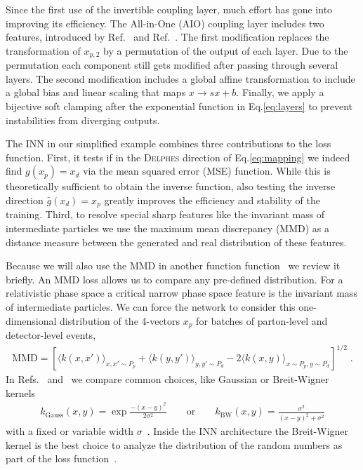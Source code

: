 Since the first use of the invertible coupling layer, much effort has
gone into improving its efficiency. The All-in-One (AIO) coupling
layer includes two features, introduced by Ref.~\cite{coupling2} and
Ref.~\cite{glow}. The first modification replaces the transformation
of $x_{p,2}$ by a permutation of the output of each layer. Due to the
permutation each component still gets modified after passing through
several layers. The second modification includes a global affine transformation
to include a global bias and linear scaling that maps $x \rightarrow s
x + b$. Finally, we apply a bijective soft clamping after the
exponential function in Eq.\eqref{eq:layers} to prevent instabilities
from diverging outputs.

The INN in our simplified example combines three contributions to the
loss function. First, it tests if in the \textsc{Delphes} direction of
Eq.\eqref{eq:mapping} we indeed find $g(x_p) = x_d$ via the mean
squared error (MSE) function. While this is theoretically sufficient
to obtain the inverse function, also testing the inverse direction
$\bar{g}(x_d) = x_p$ greatly improves the efficiency and stability of
the training. Third, to resolve special sharp features like the
invariant mass of intermediate particles we use the maximum mean
discrepancy (MMD) as a distance measure between the generated and real
distribution of these features.

Because we will also use the MMD in another function
function~\cite{gan_phasespace} we review it briefly. An MMD loss
allows us to compare any pre-defined distribution. For a relativistic
phase space a critical narrow phase space feature is the invariant
mass of intermediate particles. We can force the network to consider
this one-dimensional distribution of the 4-vectors $x_p$ for batches
of parton-level and detector-level events,
%
\begin{align}
\text{MMD} =
\left[ \langle k\left(x,x'\right)\rangle_{x,x' \sim P_p}
     + \langle k\left(y,y'\right)\rangle_{y,y' \sim P_d}
     - 2 \langle k\left(x,y \right)\rangle_{x\sim P_p,y \sim P_d} \right]^{1/2} \; .
\label{eq:MMD2}
\end{align}
%
In Refs.~\cite{gan_phasespace} and~\cite{fcgan} we compare common
choices, like Gaussian or Breit-Wigner kernels
%
\begin{align}
k_\text{Gauss} \left(x,y\right) = \exp \frac{- \left(x - y\right)^2}{2 \sigma^2}
\qquad \text{or} \qquad
k_\text{BW}\left(x,y\right) = \frac{\sigma^2}{\left(x - y\right)^2 + \sigma^2}
\label{eq:kernels2}
 \end{align}
%
with a fixed or variable width $\sigma$~\cite{fcgan}.  Inside the INN
architecture the Breit-Wigner kernel is the best choice to analyze the
distribution of the random numbers as part of the loss
function~\cite{inn}.

